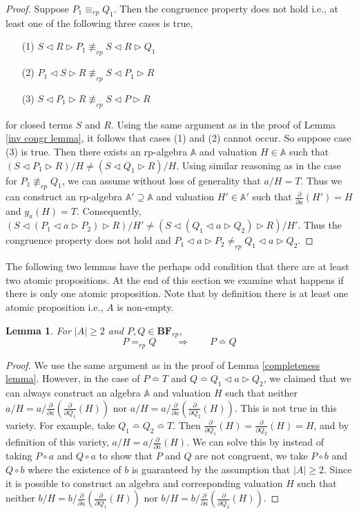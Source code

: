\documentclass[a4paper,twoside,openright]{report}
\newcommand{\dd}[1]{\frac{\partial}{\partial #1}}
\newcommand{\BF}{\ensuremath{\textbf{BF}}}
\newcommand{\syn}{\bumpeq}
\newcommand{\lef}{\ensuremath{\triangleleft}}
\newcommand{\rig}{\ensuremath{\triangleright}}
\newtheorem{lem}[theorem]{Lemma}
\begin{document}
\begin{proof}
Suppose $P_1\equiv_{rp}Q_1$. Then the congruence property does not hold i.e., at least one of the following three cases is true,
\begin{itemize}
\item[(1)] $S\lef R\rig P_1\not\equiv_{rp} S\lef R\rig Q_1$
\item[(2)] $P_1\lef S\rig R\not\equiv_{rp} S\lef P_1\rig R$
\item[(3)] $S\lef P_1\rig R\not\equiv_{rp} S\lef P\rig R$
\end{itemize}
for closed terms $S$ and $R$. Using the same argument as in the proof of Lemma \ref{inv congr lemma}, it follows that cases (1) and (2) cannot occur. So suppose case (3) is true. Then there exists an rp-algebra $\mathbb{A}$ and valuation $H\in\mathbb{A}$ such that $(S\lef P_1\rig R)/H\ne(S\lef Q_1\rig R)/H$. Using similar reasoning as in the case for $P_1\not\equiv_{rp}Q_1$, we can assume without loss of generality that $a/H=T$. Thus we can construct an rp-algebra $\mathbb{A'}\supseteq\mathbb{A}$ and valuation $H'\in\mathbb{A'}$ such that $\dd a(H')=H$ and $y_a(H)=T$. Consequently, $(S\lef(P_1\lef a\rig P_2)\rig R)/H'\ne (S\lef(Q_1\lef a\rig Q_2)\rig R)/H'$. Thus the congruence property does not hold and $P_1\lef a\rig P_2\ne_{rp} Q_1\lef a\rig Q_2$.
\end{proof}

The following two lemmas have the perhaps odd condition that there are at least two atomic propositions. At the end of this section we examine what happens if there is only one atomic proposition. Note that by definition there is at least one atomic proposition i.e., $A$ is non-empty.

\begin{lem}\label{rp completeness lemma}
For $|A|\ge 2$ and $P,Q\in\BF_{rp}$,
\[
P=_{rp}Q\qquad\Longrightarrow\qquad P\syn Q
\]
\end{lem}
\begin{proof}
We use the same argument as in the proof of Lemma \ref{completeness lemma}. However, in the case of $P\syn T$ and $Q\syn Q_1\lef a\rig Q_2$, we claimed that we can always construct an algebra $\mathbb{A}$ and valuation $H$ such that neither $a/H=a/\dd a(\dd{Q_1}(H))$ nor $a/H=a/\dd a(\dd{Q_2}(H))$. This is not true in this variety. For example, take $Q_1\syn Q_2\syn T$. Then $\dd{Q_1}(H)=\dd{Q_2}(H)=H$, and by definition of this variety, $a/H=a/\dd a(H)$. We can solve this by instead of taking $P\circ a$ and $Q\circ a$ to show that $P$ and $Q$ are not congruent, we take $P\circ b$ and $Q\circ b$ where the existence of $b$ is guaranteed by the assumption that $|A|\ge 2$. Since it is possible to construct an algebra and corresponding valuation $H$ such that neither $b/H=b/\dd a(\dd{Q_1}(H))$ nor $b/H=b/\dd a(\dd{Q_2}(H))$.
\end{proof}
\end{document}

